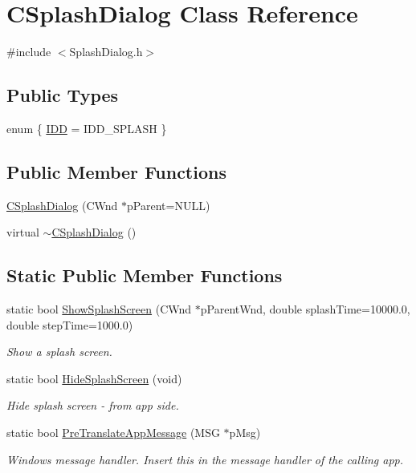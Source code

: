 \hypertarget{classCSplashDialog}{
\section{CSplashDialog Class Reference}
\label{classCSplashDialog}
}


{\ttfamily \#include $<$SplashDialog.h$>$}

\subsection*{Public Types}
\begin{DoxyCompactItemize}
\item 
enum \{ \hyperlink{classCSplashDialog_a280298b4d1d645d8f9536333c79214dda18bb872e47d50ba3a3ad56e938588791}{IDD} =  IDD\_\-SPLASH
 \}
\end{DoxyCompactItemize}
\subsection*{Public Member Functions}
\begin{DoxyCompactItemize}
\item 
\hyperlink{classCSplashDialog_a96369042a0bb1a68a042890eed5cbf25}{CSplashDialog} (CWnd $\ast$pParent=NULL)
\item 
virtual \hyperlink{classCSplashDialog_a950f67c9473af7e591fe0bba0a0feab7}{$\sim$CSplashDialog} ()
\end{DoxyCompactItemize}
\subsection*{Static Public Member Functions}
\begin{DoxyCompactItemize}
\item 
static bool \hyperlink{classCSplashDialog_aa72c8002e6217d4347ec7ad0b91a4c8a}{ShowSplashScreen} (CWnd $\ast$pParentWnd, double splashTime=10000.0, double stepTime=1000.0)
\begin{DoxyCompactList}\small\item\em Show a splash screen. \item\end{DoxyCompactList}\item 
static bool \hyperlink{classCSplashDialog_a653f62e37741ca09c1277a24d1e43fbe}{HideSplashScreen} (void)
\begin{DoxyCompactList}\small\item\em Hide splash screen -\/ from app side. \item\end{DoxyCompactList}\item 
static bool \hyperlink{classCSplashDialog_ab53b6b2fdb09477b1da7438a874ef98f}{PreTranslateAppMessage} (MSG $\ast$pMsg)
\begin{DoxyCompactList}\small\item\em Windows message handler. Insert this in the message handler of the calling app. \item\end{DoxyCompactList}\end{DoxyCompactItemize}

